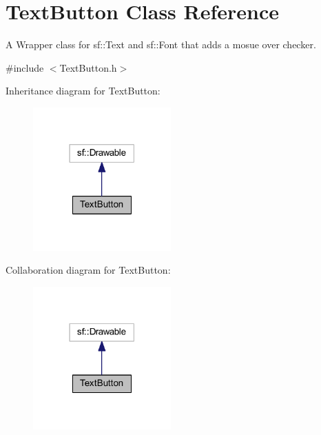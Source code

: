 \hypertarget{class_text_button}{}\section{Text\+Button Class Reference}
\label{class_text_button}


A Wrapper class for sf\+::\+Text and sf\+::\+Font that adds a mosue over checker.  




{\ttfamily \#include $<$Text\+Button.\+h$>$}



Inheritance diagram for Text\+Button\+:\nopagebreak
\begin{figure}[H]
\begin{center}
\leavevmode
\includegraphics[width=150pt]{class_text_button__inherit__graph}
\end{center}
\end{figure}


Collaboration diagram for Text\+Button\+:\nopagebreak
\begin{figure}[H]
\begin{center}
\leavevmode
\includegraphics[width=150pt]{class_text_button__coll__graph}
\end{center}
\end{figure}

